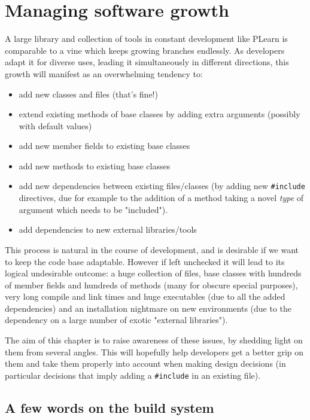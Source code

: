 \documentclass[11pt]{book}
\begin{document}

\chapter{Managing software growth}

A large library and collection of tools in constant development like PLearn is comparable to a
vine which keeps growing branches endlessly. As developers adapt it for
diverse uses, leading it simultaneously in different directions, this
growth will manifest as an overwhelming tendency to:
\begin{itemize}
\item add new classes and files (that's fine!) 
\item extend existing methods of base classes by adding extra arguments (possibly with
  default values)
\item add new member fields to existing base classes
\item add new methods to existing base classes
\item add new dependencies between existing files/classes (by adding new
  {\tt \#include} directives, due for example to the addition of a method taking a novel
  {\em type} of argument which needs to be "included").
\item add dependencies to new external libraries/tools 
\end{itemize}
This process is natural in the course of development, and is desirable if
we want to keep the code base adaptable. However if left unchecked it will lead to
its logical undesirable outcome: a huge collection of files, base classes with
hundreds of member fields and hundreds of methods (many for obscure special
purposes), very long compile and link times and huge executables (due to all
the added dependencies) and an installation nightmare on new environments
(due to the dependency on a large number of exotic "external libraries").

The aim of this chapter is to raise awareness of these issues, by shedding
light on them from several angles. This will hopefully help developers get a better
grip on them and take them properly into account when making design
decisions (in particular decisions that imply adding a {\tt \#include} in an
existing file).

\section{A few words on the build system}
\end{document}
